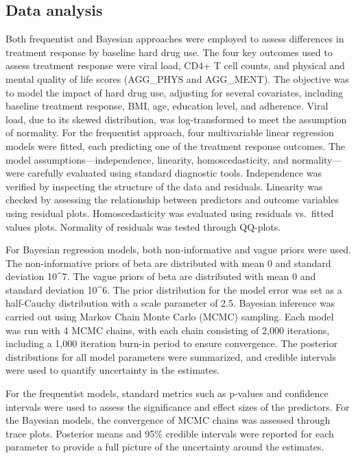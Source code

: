 \documentclass[
  12pt,
]{article}
\begin{document}
\hypertarget{data-analysis}{%
\subsection{Data analysis}\label{data-analysis}}

Both frequentist and Bayesian approaches were employed to assess
differences in treatment response by baseline hard drug use. The four
key outcomes used to assess treatment response were viral load, CD4+ T
cell counts, and physical and mental quality of life scores (AGG\_PHYS
and AGG\_MENT). The objective was to model the impact of hard drug use,
adjusting for several covariates, including baseline treatment response,
BMI, age, education level, and adherence. Viral load, due to its skewed
distribution, was log-transformed to meet the assumption of normality.
For the frequentist approach, four multivariable linear regression
models were fitted, each predicting one of the treatment response
outcomes. The model assumptions---independence, linearity,
homoscedasticity, and normality---were carefully evaluated using
standard diagnostic tools. Independence was verified by inspecting the
structure of the data and residuals. Linearity was checked by assessing
the relationship between predictors and outcome variables using residual
plots. Homoscedasticity was evaluated using residuals vs.~fitted values
plots. Normality of residuals was tested through QQ-plots.

For Bayesian regression models, both non-informative and vague priors
were used. The non-informative priors of beta are distributed with mean
0 and standard deviation 10\^{}7. The vague priors of beta are
distributed with mean 0 and standard deviation 10\^{}6. The prior
distribution for the model error was set as a half-Cauchy distribution
with a scale parameter of 2.5. Bayesian inference was carried out using
Markov Chain Monte Carlo (MCMC) sampling. Each model was run with 4 MCMC
chains, with each chain consisting of 2,000 iterations, including a
1,000 iteration burn-in period to ensure convergence. The posterior
distributions for all model parameters were summarized, and credible
intervals were used to quantify uncertainty in the estimates.

For the frequentist models, standard metrics such as p-values and
confidence intervals were used to assess the significance and effect
sizes of the predictors. For the Bayesian models, the convergence of
MCMC chains was assessed through trace plots. Posterior means and 95\%
credible intervals were reported for each parameter to provide a full
picture of the uncertainty around the estimates.
\end{document}
